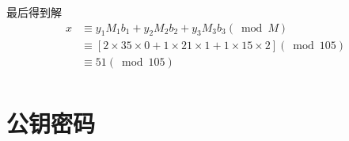 \documentclass[UTF8]{ctexart}
\begin{document}
    最后得到解
    $$
    \begin{aligned}
        x&\equiv y_1M_1b_1+y_2M_2b_2+y_3M_3b_3(\bmod M)\\
         &\equiv [2\times 35\times 0+1\times 21\times 1+1\times 15\times 2](\bmod 105)\\
         &\equiv 51(\bmod 105)\\
    \end{aligned}
    $$

\section{公钥密码}
\end{document}
